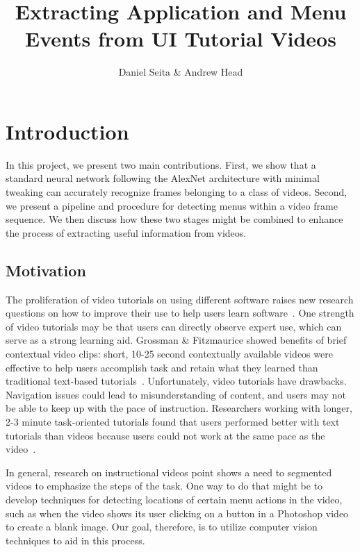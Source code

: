 \documentclass[10pt]{article}
\title{Extracting Application and Menu Events from UI Tutorial Videos}
\author{Daniel Seita \& Andrew Head}
\begin{document}
\maketitle

\section{Introduction}

In this project, we present two main contributions. First, we show that a standard neural network
following the AlexNet architecture with minimal tweaking can accurately recognize frames belonging
to a class of videos.  Second, we present a pipeline and procedure for detecting menus within a
video frame sequence. We then discuss how these two stages might be combined to enhance the process
of extracting useful information from videos.

\subsection{Motivation}

The proliferation of video tutorials on using different software raises new research questions on
how to improve their use to help users learn software~\cite{matejka_ambient_2011,
pongnumkul_pause-and-play_2011}.  One strength of video tutorials may be that users can directly
observe expert use, which can serve as a strong learning aid. Grossman \& Fitzmaurice showed
benefits of brief contextual video clips: short, 10-25 second contextually available videos were
effective to help users accomplish task and retain what they learned than traditional text-based
tutorials~\cite{grossman_toolclips_2010}. Unfortunately, video tutorials have drawbacks. Navigation
issues could lead to misunderstanding of content, and users may not be able to keep up with the pace
of instruction. Researchers working with longer, 2-3 minute task-oriented tutorials found that users
performed better with text tutorials than videos because users could not work at the same pace as
the video~\cite{grabler_generating_2009}.

In general, research on instructional videos point shows a need to segmented videos to emphasize the
steps of the task. One way to do that might be to develop techniques for detecting locations of
certain menu actions in the video, such as when the video shows its user clicking on a button in a
Photoshop video to create a blank image. Our goal, therefore, is to utilize computer vision
techniques to aid in this process.
\end{document}
